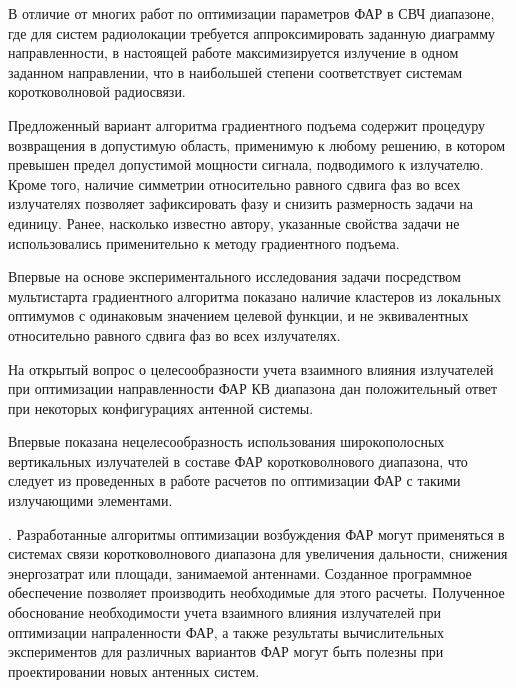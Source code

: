 В отличие от многих работ по оптимизации параметров ФАР в СВЧ диапазоне, где для систем радиолокации требуется аппроксимировать заданную диаграмму направленности, в настоящей работе максимизируется излучение в одном заданном направлении, что в наибольшей степени соответствует системам коротковолновой радиосвязи.

Предложенный вариант алгоритма градиентного подъема содержит процедуру возвращения в допустимую область, применимую к любому решению, в котором превышен предел допустимой мощности сигнала, подводимого к излучателю.
Кроме того, наличие симметрии относительно равного сдвига фаз во всех излучателях позволяет зафиксировать фазу и снизить размерность задачи на единицу. Ранее, насколько известно  автору, указанные свойства задачи не использовались применительно к методу градиентного подъема.

   
Впервые на основе экспериментального исследования задачи посредством мультистарта градиентного алгоритма показано наличие кластеров из локальных оптимумов с одинаковым значением целевой функции, и не эквивалентных относительно равного сдвига фаз во всех излучателях.

На открытый вопрос о целесообразности учета взаимного влияния излучателей при оптимизации направленности ФАР КВ диапазона дан положительный ответ при некоторых конфигурациях антенной системы. 

Впервые показана нецелесообразность использования широкополосных вертикальных излучателей в составе ФАР коротковолнового диапазона, что следует из проведенных в работе расчетов по оптимизации ФАР с такими излучающими элементами.

{\influence}. 
Разработанные алгоритмы оптимизации возбуждения ФАР могут  применяться в системах связи коротковолнового диапазона для увеличения дальности, снижения энергозатрат или площади, занимаемой антеннами. Созданное программное обеспечение позволяет производить необходимые для этого расчеты.
Полученное обоснование необходимости учета взаимного влияния излучателей при оптимизации напраленности ФАР, а также результаты вычислительных экспериментов для различных вариантов ФАР могут быть полезны при проектировании новых антенных систем. 
{\methods}

